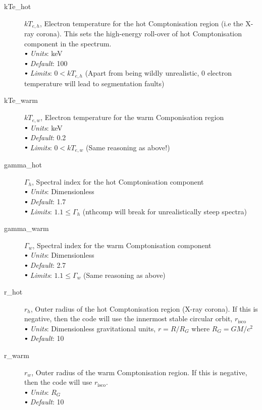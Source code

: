 \documentclass[a4paper, 11pt, times, onecolumn]{article}
\newcommand{\kTh}{kT_{e, h}}
\newcommand{\kTw}{kT_{e, w}}
\newcommand{\risco}{r_{\mathrm{isco}}}
\newcommand{\sbt}{\,\begin{picture}(-1,1)(-1,-3)\circle*{3}\end{picture}\ }
\begin{document}
\begin{description}
	\item[kTe\_hot] $\kTh$, Electron temperature for the hot Comptonisation region (i.e the X-ray corona). This sets the high-energy roll-over of hot Comptonisation component in the spectrum. \\
		$\sbt$ {\it Units}: keV \\
		$\sbt$ {\it Default}: 100  \\
		$\sbt$ {\it Limits}: $0 < \kTh$ (Apart from being wildly unrealistic, 0 electron temperature will lead to segmentation faults) 
	
	\item[kTe\_warm] $\kTw$, Electron temperature for the warm Componisation region \\
		$\sbt$ {\it Units}: keV \\
		$\sbt$ {\it Default}: 0.2 \\
		$\sbt$ {\it Limits}: $0 < \kTw$ (Same reasoning as above!)
	
	\item[gamma\_hot] $\Gamma_{h}$, Spectral index for the hot Comptonisation component \\
		$\sbt$ {\it Units}: Dimensionless \\
		$\sbt$ {\it Default}: 1.7 \\
		$\sbt$ {\it Limits}: $1.1 \leq \Gamma_{h}$ ({\sc nthcomp} will break for unrealistically steep spectra)
	
	\item[gamma\_warm] $\Gamma_{w}$, Spectral index for the warm Comptonisation component \\
		$\sbt$ {\it Units}: Dimensionless \\
		$\sbt$ {\it Default}: 2.7 \\
		$\sbt$ {\it Limits}: $1.1 \leq \Gamma_{w}$ (Same reasoning as above)
	
	\item[r\_hot] $r_{h}$, Outer radius of the hot Comptonisation region (X-ray corona). If this is negative, then the code will use the innermost stable circular orbit, $\risco$ \\
		$\sbt$ {\it Units}: Dimensionless gravitational units, $r=R/R_{G}$ where $R_{G} = GM/c^{2}$ \\
		$\sbt$ {\it Default}: 10
	
	\item[r\_warm] $r_{w}$, Outer radius of the warm Comptonisation region. If this is negative, then the code will use $\risco$. \\
		$\sbt$ {\it Units}: $R_{G}$ \\
		$\sbt$ {\it Default}: 10
	

\end{description}
\end{document}
